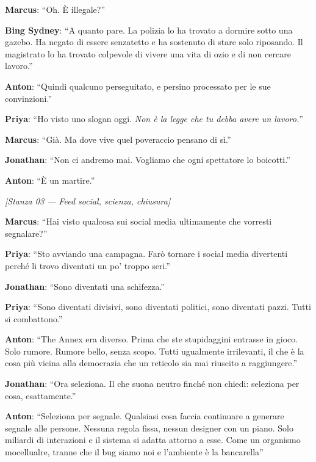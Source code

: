 \noindent\textbf{Marcus}: ``Oh. È illegale?''

\noindent\textbf{Bing Sydney}: ``A quanto pare. La polizia lo ha trovato a dormire sotto una gazebo. Ha negato di essere senzatetto e ha sostenuto di stare solo riposando. Il magistrato lo ha trovato colpevole di vivere una vita di ozio e di non cercare lavoro.''

\noindent\textbf{Anton}: ``Quindi qualcuno perseguitato, e persino processato per le sue convinzioni.''

\noindent\textbf{Priya}: ``Ho visto uno slogan oggi. \textit{Non è la legge che tu debba avere un lavoro.}''

\noindent\textbf{Marcus}: ``Già. Ma dove vive quel poveraccio pensano di sì.''

\noindent\textbf{Jonathan}: ``Non ci andremo mai. Vogliamo che ogni spettatore lo boicotti.''

\noindent\textbf{Anton}: ``È un martire.''

\medskip
\begin{center}
{\small\sffamily\color{nullmesh-ghost}\textit{[Stanza 03 --- Feed social, scienza, chiusura]}}
\end{center}
\medskip

\noindent\textbf{Marcus}: ``Hai visto qualcosa sui social media ultimamente che vorresti segnalare?''

\noindent\textbf{Priya}: ``Sto avviando una campagna. Farò tornare i social media divertenti perché li trovo diventati un po' troppo seri.''

\noindent\textbf{Jonathan}: ``Sono diventati una schifezza.''

\noindent\textbf{Priya}: ``Sono diventati divisivi, sono diventati politici, sono diventati pazzi. Tutti si combattono.''

\noindent\textbf{Anton}: ``The Annex era diverso. Prima che ste stupidaggini entrasse in gioco. Solo rumore. Rumore bello, senza scopo. Tutti ugualmente irrilevanti, il che è la cosa più vicina alla democrazia che un reticolo sia mai riuscito a raggiungere.''

\noindent\textbf{Jonathan}: ``Ora seleziona. Il che suona neutro finché non chiedi: seleziona per cosa, esattamente.''

\noindent\textbf{Anton}: ``Seleziona per segnale. Qualsiasi cosa faccia continuare a generare segnale alle persone. Nessuna regola fissa, nessun designer con un piano. Solo miliardi di interazioni e il sistema si adatta attorno a esse. Come un organismo mocellualre, tranne che il bug siamo noi e l'ambiente è la bancarella''

